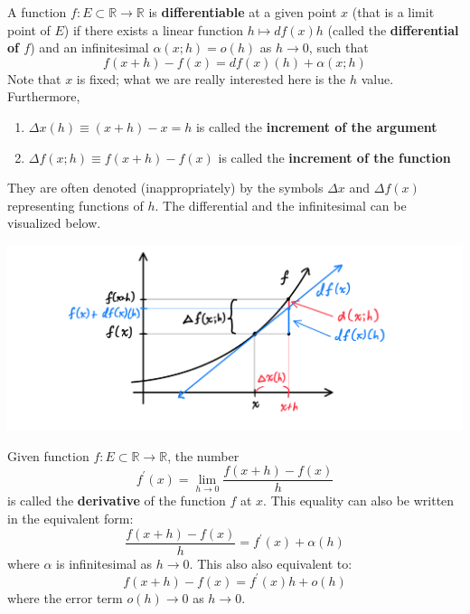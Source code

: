   \begin{definition}
    A function $f: E \subset \mathbb{R} \longrightarrow \mathbb{R}$ is \textbf{differentiable} at a given point $x$ (that is a limit point of $E$) if there exists a linear function $h \mapsto df(x) h$ (called the \textbf{differential of $f$}) and an infinitesimal $\alpha (x;h) = o(h)$ as $h \rightarrow 0$, such that
    \[f(x + h) - f(x) = df(x) (h) + \alpha (x; h)\]
    Note that $x$ is fixed; what we are really interested here is the $h$ value. Furthermore, 
    \begin{enumerate}
      \item $\Delta x(h) \equiv (x + h) - x = h$ is called the \textbf{increment of the argument}
      \item $\Delta f(x;h) \equiv f(x + h) - f(x)$ is called the \textbf{increment of the function} 
    \end{enumerate}
    They are often denoted (inappropriately) by the symbols $\Delta x$ and $\Delta f(x)$ representing functions of $h$. The differential and the infinitesimal can be visualized below. 
    \begin{center}
        \includegraphics[scale=0.25]{img/Differential_Diagram.PNG}
    \end{center}
  \end{definition}

  \begin{definition}[Derivative]
    Given function $f: E \subset \mathbb{R} \longrightarrow \mathbb{R}$, the number
    \[f^\prime (x) = \lim_{h \rightarrow 0} \frac{f(x+h) - f(x)}{h}\]
    is called the \textbf{derivative} of the function $f$ at $x$. This equality can also be written in the equivalent form: 
    \[\frac{f(x+h) - f(x)}{h} = f^\prime (x) + \alpha (h)\]
    where $\alpha$ is infinitesimal as $h \rightarrow 0$. This also also equivalent to:
    \[f(x+h) - f(x) = f^\prime (x) h + o (h)\]
    where the error term $o(h) \rightarrow 0$ as $h \rightarrow 0$. 
  \end{definition}

